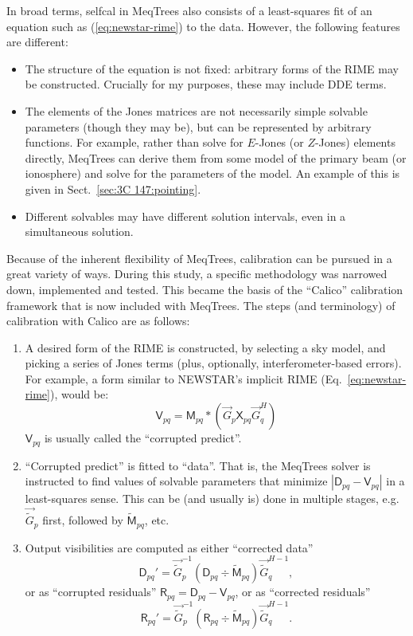 \documentclass{aa}
\newcommand{\herm}{H}
\newcommand{\jones}[2]{\vec {#1}_{#2}}
\newcommand{\jonesinv}[2]{\vec {#1}^{-1}_{#2}}
\newcommand{\jonesT}[2]{\vec {#1}^{\herm}_{#2}}
\newcommand{\jonesTinv}[2]{\vec {#1}^{{\herm}-1}_{#2}}
\newcommand{\coh}[2]{\mathsf{{#1}}_{{#2}}}
\begin{document}
In broad terms, selfcal in MeqTrees also consists of a least-squares fit of an equation such as (\ref{eq:newstar-rime}) to the data. However, the following features are different:

\begin{itemize}
\item The structure of the equation is not fixed: arbitrary forms of the RIME may be constructed. Crucially for my purposes, these may include DDE terms.
\item The elements of the Jones matrices are not necessarily simple solvable parameters (though they may be), but can be represented by arbitrary functions. For example, rather than solve for $E$-Jones (or $Z$-Jones) elements directly, MeqTrees can derive them from some model of the primary beam (or ionosphere) and solve for the parameters of the model. An example of this is given in Sect.~\ref{sec:3C 147:pointing}.
\item Different solvables may have different solution intervals, even in a simultaneous solution.
\end{itemize}

Because of the inherent flexibility of MeqTrees, calibration can be pursued in a great variety of ways. During this study, a specific methodology was narrowed down, implemented and tested. This became the basis of the ``Calico'' calibration framework that is now included with MeqTrees. The steps (and terminology) of calibration with Calico are as follows:

\begin{enumerate}
\item A desired form of the RIME is constructed, by selecting a sky model, and picking a series of Jones terms (plus, optionally, interferometer-based errors). For example, a form similar to NEWSTAR's implicit RIME (Eq.~\ref{eq:newstar-rime}), would be:
\[
\coh{V}{pq} =  \coh{M}{pq} \ast ( \jones{G}{p} \coh{X}{pq} \jonesT{G}{q} ) 
\]
$\coh{V}{pq}$ is usually called the ``corrupted predict''.
\item ``Corrupted predict'' is fitted to ``data''. That is, the MeqTrees solver is instructed to find values of solvable parameters that minimize $|\coh{D}{pq}-\coh{V}{pq}|$ in a least-squares sense. This can be (and usually is) done in multiple stages, e.g. $\jones{\tilde{G}}{p}$ first, followed by $\coh{\tilde{M}}{pq}$, etc.
\item Output visibilities are computed as either ``corrected data''
\[
\coh{D}{pq}' = \jonesinv{\tilde{G}}{p} (\coh{D}{pq} \div \coh{\tilde{M}}{pq}) \jonesTinv{\tilde{G}}{q},
\]
or as ``corrupted residuals'' $\coh{R}{pq} = \coh{D}{pq}-\coh{V}{pq}$, or as ``corrected residuals''
\[
\coh{R}{pq}' = \jonesinv{\tilde{G}}{p} (\coh{R}{pq} \div \coh{\tilde{M}}{pq}) \jonesTinv{\tilde{G}}{q}.
\]
\end{enumerate}
\end{document}
